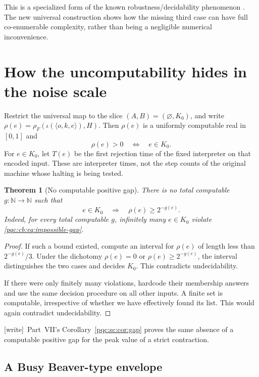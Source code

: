 \documentclass[11pt,letterpaper]{article}
\numberwithin{equation}{section}
\newtheorem{theorem}{Theorem}[section]
\theoremstyle{definition}
\theoremstyle{remark}
\newcommand{\N}{\mathbb N}
\newcommand{\wtag}{\textup{[write]}}
\begin{document}
This is a specialized form of the known robustness/decidability phenomenon
\cite{BGH2013}.  The new universal construction shows how the missing third
case can have full co-enumerable complexity, rather than being a negligible
numerical inconvenience.

\section{How the uncomputability hides in the noise scale}
\label{pqc:cb:sec:scale}

Restrict the universal map to the slice $(A,B)=(\varnothing,K_0)$, and write
$\rho(e)=\rho_F(\iota(\langle o,k,e\rangle),H)$.  Then $\rho(e)$ is a uniformly
computable real in $[0,1]$ and
\[
 \rho(e)>0\quad\Longleftrightarrow\quad e\in K_0.
\]
For $e\in K_0$, let $T(e)$ be the first rejection time of the fixed
interpreter on that encoded input.  These are interpreter times, not the
step counts of the original machine whose halting is being tested.

\begin{theorem}[No computable positive gap]
\label{pqc:cb:thm:no-gap}
There is no total computable $g:\N\to\N$ such that
\begin{equation}
 e\in K_0\quad\Longrightarrow\quad\rho(e)\ge2^{-g(e)}.
 \label{pqc:cb:eq:impossible-gap}
\end{equation}
Indeed, for every total computable $g$, infinitely many $e\in K_0$ violate
\eqref{pqc:cb:eq:impossible-gap}.
\end{theorem}
\begin{proof}
If such a bound existed, compute an interval for $\rho(e)$ of length less
than $2^{-g(e)}/3$.  Under the dichotomy $\rho(e)=0$ or
$\rho(e)\ge2^{-g(e)}$, the interval distinguishes the two cases and decides
$K_0$.  This contradicts undecidability.

If there were only finitely many violations, hardcode their membership
answers and use the same decision procedure on all other inputs.  A finite
set is computable, irrespective of whether we have effectively found its
list.  This would again contradict undecidability.
\end{proof}
\wtag\ Part~VII's Corollary~\ref{pqc:sc:cor:gap} proves the same absence of a
computable positive gap for the peak value of a strict contraction.

\subsection{A Busy Beaver-type envelope}
\end{document}

